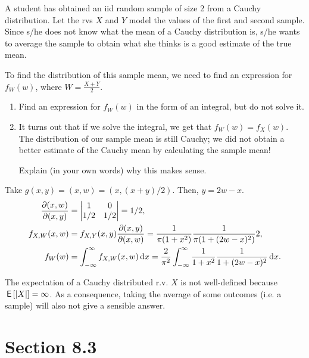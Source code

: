 \begin{exercise}
A student has obtained an iid
random sample of size 2 from a Cauchy distribution. Let the rvs $X$ and $Y$ model the  values of the first and second sample.
Since s/he does not know what the mean of a Cauchy distribution is, s/he wants to average the sample to obtain what she thinks is a good estimate of the true mean.

To find the distribution of this sample mean, we need to find an expression for $f_W(w)$, where $W=\frac{X+Y}2$.

\begin{enumerate}
\item Find an expression for $f_W(w)$ in the form of an integral, but do not solve it.
\item It turns out that if we solve the integral, we get that $f_W(w) = f_X(w)$. The distribution of our sample mean is still Cauchy; we did not obtain a better estimate of the Cauchy mean by calculating the sample mean!

Explain (in your own words) why this makes sense.
\end{enumerate}
\begin{solution}
 Take $g(x,y) = (x, w) = (x, (x+y)/2)$. Then, $y=2w -x$.
\begin{align}
\frac{\partial (x,w)}{\partial (x, y)} &=
  \begin{vmatrix}
    1 & 0 \\
1/2 & 1/2
  \end{vmatrix} = 1/2,\\
f_{X,W}(x,w) &= f_{X,Y}(x,y) \frac{\partial(x,y)}{\partial(x,w)} = \frac{1}{\pi(1+x^{2})}\frac{1}{\pi(1+(2w-x)^{2})} 2,\\
f_{W}(w) &= \int_{-\infty}^{\infty} f_{X,W}(x,w) \,\textrm{d}x = \frac{2}{\pi^{2}} \int_{-\infty}^{\infty} \frac{1}{1+x^{2}}\frac{1}{1+(2w-x)^{2}} \,\textrm{d}x.
\end{align}

The expectation of a Cauchy distributed r.v. $X$ is not well-defined because $\,\mathsf{E}\left[|X|\right] = \infty$. As a consequence, taking the average of some outcomes (i.e. a sample) will also not give a sensible answer.
\end{solution}
\end{exercise}


\section{Section 8.3}
\label{sec:section-8.3}

